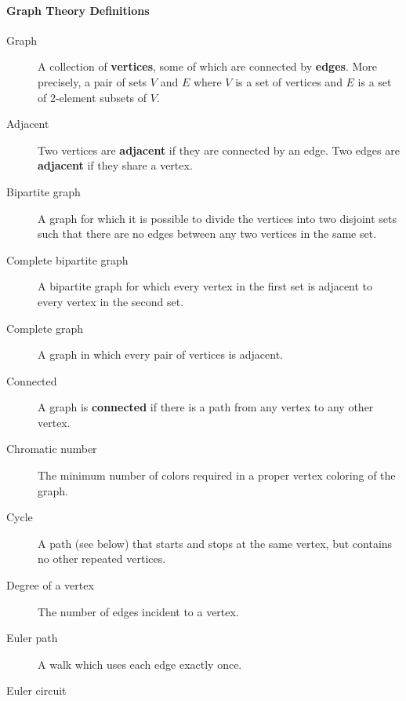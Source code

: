 \documentclass[10pt,]{book}
\newcommand{\terminology}[1]{\textbf{#1}}
\theoremstyle{plain}
\theoremstyle{definition}
\theoremstyle{definition}
\theoremstyle{definition}
\numberwithin{equation}{chapter}
\begin{document}
\paragraph[{Graph Theory Definitions}]{Graph Theory Definitions}\hypertarget{paragraphs-3}{}
\hypertarget{p-106}{}%
\leavevmode%
\begin{description}
\item[{Graph}]\hypertarget{li-9}{}\hypertarget{p-107}{}%
 A collection of \terminology{vertices}, some of which are connected by \terminology{edges}. More precisely, a pair of sets \(V\) and \(E\) where \(V\) is a set of vertices and \(E\) is a set of 2-element subsets of \(V\).%
\item[{Adjacent}]\hypertarget{li-10}{}\hypertarget{p-108}{}%
 Two vertices are \terminology{adjacent} if they are connected by an edge. Two edges are \terminology{adjacent} if they share a vertex.%
\item[{Bipartite graph}]\hypertarget{li-11}{}\hypertarget{p-109}{}%
 A graph for which it is possible to divide the vertices into two disjoint sets such that there are no edges between any two vertices in the same set.%
\item[{Complete bipartite graph}]\hypertarget{li-12}{}\hypertarget{p-110}{}%
A bipartite graph for which every vertex in the first set is adjacent to every vertex in the second set.%
\item[{Complete graph}]\hypertarget{li-13}{}\hypertarget{p-111}{}%
 A graph in which every pair of vertices is adjacent.%
\item[{Connected}]\hypertarget{li-14}{}\hypertarget{p-112}{}%
 A graph is \terminology{connected} if there is a path from any vertex to any other vertex.%
\item[{Chromatic number}]\hypertarget{li-15}{}\hypertarget{p-113}{}%
 The minimum number of colors required in a proper vertex coloring of the graph.%
\item[{Cycle}]\hypertarget{li-16}{}\hypertarget{p-114}{}%
 A path (see below) that starts and stops at the same vertex, but contains no other repeated vertices.%
\item[{Degree of a vertex}]\hypertarget{li-17}{}\hypertarget{p-115}{}%
 The number of edges incident to a vertex.%
\item[{Euler path}]\hypertarget{li-18}{}\hypertarget{p-116}{}%
A walk which uses each edge exactly once.%
\item[{Euler circuit}]\hypertarget{li-19}{}\hypertarget{p-117}{}%

\end{description}
\end{document}
